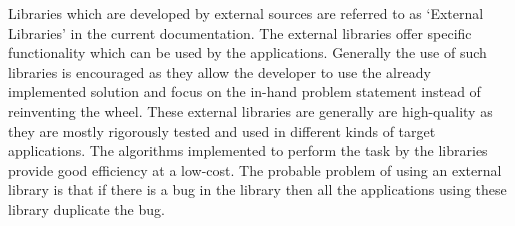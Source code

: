 Libraries which are developed by external sources are referred to as {\lq}External Libraries{\rq} in the current documentation. The external libraries offer specific functionality which can be used by the applications. Generally the use of such libraries is encouraged as they allow the developer to use the already implemented solution and focus on the in-hand problem statement instead of reinventing the wheel. These external libraries are generally are high-quality as they are mostly rigorously tested and used in different kinds of target applications. The algorithms implemented to perform the task by the libraries provide good efficiency at a low-cost. The probable problem of using an external library is that if there is a bug in the library then all the applications using these library duplicate the bug. \newline

